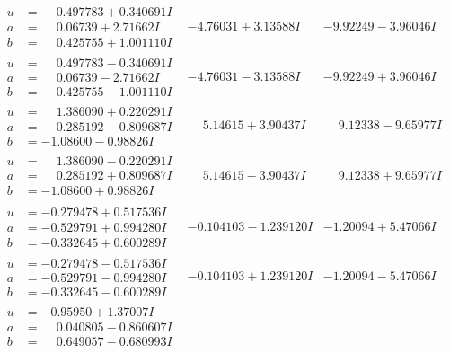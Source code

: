 \documentclass[1p]{elsarticle_modified}
\theoremstyle{definition}
\begin{document}
$$\begin{array}{c|c|c}
\begin{aligned}
u &= \phantom{-}0.497783 + 0.340691 I \\
a &= \phantom{-}0.06739 + 2.71662 I \\
b &= \phantom{-}0.425755 + 1.001110 I\end{aligned}
 & -4.76031 + 3.13588 I & -9.92249 - 3.96046 I \\ \hline\begin{aligned}
u &= \phantom{-}0.497783 - 0.340691 I \\
a &= \phantom{-}0.06739 - 2.71662 I \\
b &= \phantom{-}0.425755 - 1.001110 I\end{aligned}
 & -4.76031 - 3.13588 I & -9.92249 + 3.96046 I \\ \hline\begin{aligned}
u &= \phantom{-}1.386090 + 0.220291 I \\
a &= \phantom{-}0.285192 - 0.809687 I \\
b &= -1.08600 - 0.98826 I\end{aligned}
 & \phantom{-}5.14615 + 3.90437 I & \phantom{-}9.12338 - 9.65977 I \\ \hline\begin{aligned}
u &= \phantom{-}1.386090 - 0.220291 I \\
a &= \phantom{-}0.285192 + 0.809687 I \\
b &= -1.08600 + 0.98826 I\end{aligned}
 & \phantom{-}5.14615 - 3.90437 I & \phantom{-}9.12338 + 9.65977 I \\ \hline\begin{aligned}
u &= -0.279478 + 0.517536 I \\
a &= -0.529791 + 0.994280 I \\
b &= -0.332645 + 0.600289 I\end{aligned}
 & -0.104103 - 1.239120 I & -1.20094 + 5.47066 I \\ \hline\begin{aligned}
u &= -0.279478 - 0.517536 I \\
a &= -0.529791 - 0.994280 I \\
b &= -0.332645 - 0.600289 I\end{aligned}
 & -0.104103 + 1.239120 I & -1.20094 - 5.47066 I \\ \hline\begin{aligned}
u &= -0.95950 + 1.37007 I \\
a &= \phantom{-}0.040805 - 0.860607 I \\
b &= \phantom{-}0.649057 - 0.680993 I\end{aligned}

\end{array}$$
\end{document}
